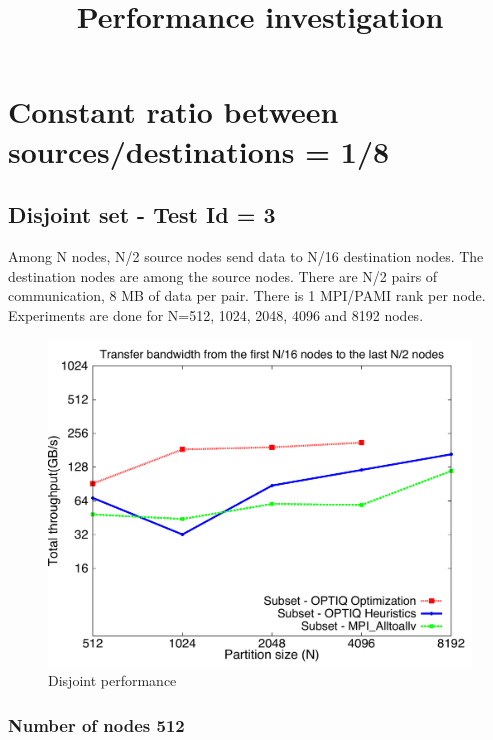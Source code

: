\documentclass[letter]{article}
\title{Performance investigation}
\begin{document}
\maketitle

\section{Constant ratio between sources/destinations =  1/8}

\subsection{Disjoint set - Test Id = 3}

Among N nodes, N/2 source nodes send data to N/16 destination nodes. The destination nodes are among the source nodes. There are N/2 pairs of communication, 8 MB of data per pair. There is 1 MPI/PAMI rank per node. Experiments are done for N=512, 1024, 2048, 4096 and 8192 nodes.

\begin{figure}[h]
\vspace{-0.1in}
\centering
\includegraphics[scale=0.40]{report_figures/constantr_3.pdf}
\vspace{-0.1in}
\caption{Disjoint performance}
\vspace{-0.1in}
\label{fig:patterns}
\end{figure}

\newpage

\subsubsection{Number of nodes 512}
\end{document}
